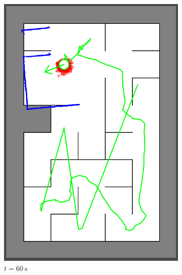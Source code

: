 \begin{figure}[H]
\begin{subfigure}{0.2\textwidth}
         \includegraphics[width=\textwidth]{figures/localization_60s.png}
         \caption{$t = \SI{60}{\second}$}
         \label{mapping20s}
     \end{subfigure}
     \hspace{1em}
     \begin{subfigure}{0.2\textwidth}
         \centering

\end{subfigure}
\end{figure}
